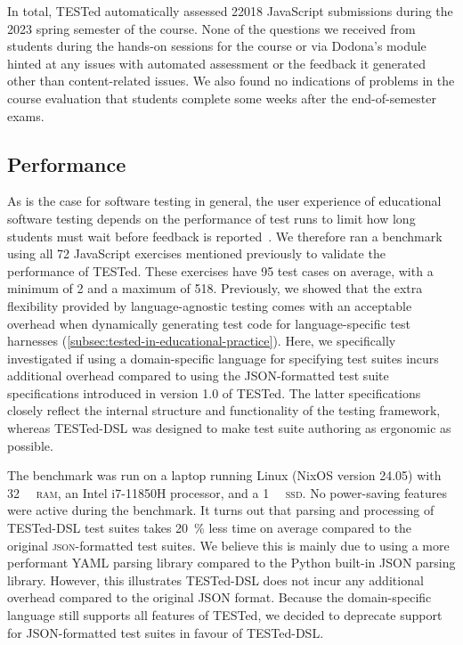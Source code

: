 \documentclass[../main]{subfiles}
\begin{document}
In total, TESTed automatically assessed \num{22018} JavaScript submissions during the 2023 spring semester of the course.
None of the questions we received from students during the hands-on sessions for the course or via Dodona's  module hinted at any issues with automated assessment or the feedback it generated other than content-related issues.
We also found no indications of problems in the course evaluation that students complete some weeks after the end-of-semester exams.

\subsection{Performance}\label{subsec:dsl-performance}

As is the case for software testing in general, the user experience of educational software testing depends on the performance of test runs to limit how long students must wait before feedback is reported~\autocite{sarsaSpeedingAutomatedAssessment2022}.
We therefore ran a benchmark using all 72 JavaScript exercises mentioned previously to validate the performance of TESTed.
These exercises have 95 test cases on average, with a minimum of 2 and a maximum of 518.
Previously, we showed that the extra flexibility provided by language-agnostic testing comes with an acceptable overhead when dynamically generating test code for language-specific test harnesses (\cref{subsec:tested-in-educational-practice}).
Here, we specifically investigated if using a domain-specific language for specifying test suites incurs additional overhead compared to using the JSON-formatted test suite specifications introduced in version 1.0 of TESTed.
The latter specifications closely reflect the internal structure and functionality of the testing framework, whereas TESTed-DSL was designed to make test suite authoring as ergonomic as possible.

The benchmark was run on a laptop running Linux (NixOS version 24.05) with \qty{32}{\gibi\byte} \textsc{ram}, an Intel i7-11850H processor, and a \qty{1}{\tebi\byte} \textsc{ssd}.
No power-saving features were active during the benchmark.
It turns out that parsing and processing of TESTed-DSL test suites takes \qty{20}{\percent} less time on average compared to the original \textsc{json}-formatted test suites.
We believe this is mainly due to using a more performant YAML parsing library compared to the Python built-in JSON parsing library.
However, this illustrates TESTed-DSL does not incur any additional overhead compared to the original JSON format.
Because the domain-specific language still supports all features of TESTed, we decided to deprecate support for JSON-formatted test suites in favour of TESTed-DSL\@.
\end{document}
